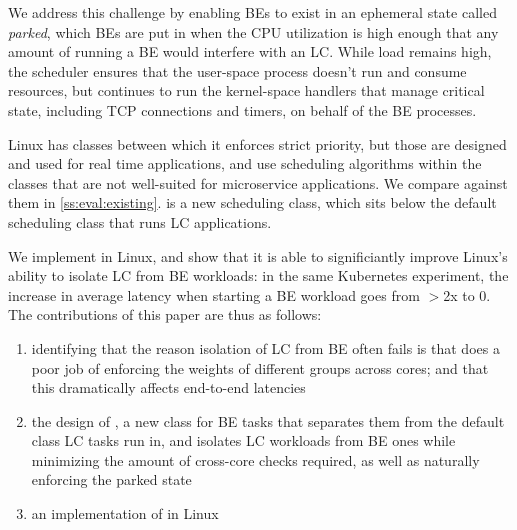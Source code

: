 We address this challenge by enabling BEs to exist in an ephemeral state called
\textit{parked}, which BEs are put in when the CPU utilization is high enough
that any amount of running a BE would interfere with an LC. While load remains
high, the scheduler ensures that the user-space process doesn't run and consume
resources, but continues to run the kernel-space handlers that manage critical
state, including TCP connections and timers, on behalf of the BE processes. 

Linux has classes between which it enforces strict priority, but those are
designed and used for real time applications, and use scheduling algorithms
within the classes that are not well-suited for microservice applications. We
compare against them in \autoref{ss:eval:existing}. \beclass{} is a new
scheduling class, which sits below the default scheduling class that runs LC
applications.

We implement \beclass{} in Linux, and show that it is able to significiantly
improve Linux's ability to isolate LC from BE workloads: in the same Kubernetes
experiment, the increase in average latency when starting a BE workload goes
from $>$2x to 0. The contributions of this paper are thus as follows: 
\begin{enumerate}
    \item identifying that the reason isolation of LC from BE often fails is that
    \cgroups{} does a poor job of enforcing the weights of different groups
    across cores; and that this dramatically affects end-to-end latencies
    \item the design of \beclass{}, a new class for BE tasks that separates
    them from the default class LC tasks run in, and isolates LC workloads from
    BE ones while minimizing the amount of cross-core checks required, as well as
    naturally enforcing the parked state
    \item an implementation of \beclass{} in Linux
\end{enumerate}
